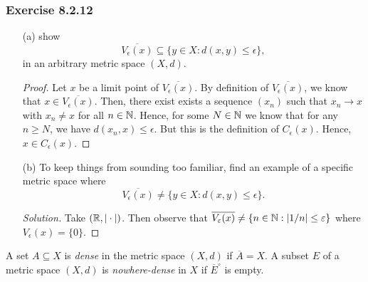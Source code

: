 \subsubsection{Exercise 8.2.12}
\begin{enumerate}
    \item[(a)] show 
        \[  \overline{V_{\epsilon }(x)}  \subseteq \{ y \in X : d(x,y) \leq \epsilon  \},\]
        in an arbitrary metric space \( (X,d) \).
        \begin{proof}
            Let \( x  \) be a limit point of \( \overline{V_{\epsilon }(x)} \). By definition of \( \overline{V_{\epsilon }(x)}  \), we know that \( x \in \overline{V_{\epsilon }(x)} \). Then, there exist exists a sequence \( (x_{n})  \) such that \( x_{n} \to x  \) with \( x_{n} \neq x  \) for all \( n \in \mathbb{N}  \). Hence, for some \( N \in \mathbb{N}  \) we know that for any \( n \geq N  \), we have \( d(x_{n}, x) \leq \epsilon  \). But this is the definition of \( C_{\epsilon }(x) \). Hence, \( x \in C_{\epsilon }(x) \).
        \end{proof}
    \item[(b)] To keep things from sounding too familiar, find an example of a specific metric space where 
        \[  \overline{V_{\epsilon }(x)} \neq \{ y \in X : d(x,y) \leq \epsilon  \}.\]
        \begin{proof}[Solution]
        Take \( (\mathbb{R}, | \cdot | ) \). Then observe that \( \overline{V_{\varepsilon }(x)} \neq \{ n \in \mathbb{N} : | 1 / n | \leq \varepsilon \}  \) where \( V_{\epsilon }(x) =  \{ 0 \}  \).
        \end{proof}
\end{enumerate}

\begin{definition}
A set \( A \subseteq X  \) is \textit{dense} in the metric space \( (X,d) \) if \( \overline{A} = X  \). A subset \( E  \) of a metric space \( (X,d) \) is \textit{nowhere-dense} in \( X  \) if \( \overline{E}^{\circ}  \) is empty.
\end{definition}

